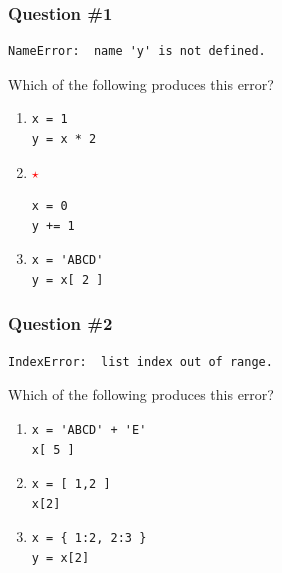 \documentclass[11pt]{beamer}
\newcommand{\correctstar}{\textcolor{red}{$\star$}}
\begin{document}
\begin{frame}[fragile]
  \frametitle{Question \#1}
  \Enlarge

  \begin{Verbatim}
NameError:  name 'y' is not defined.
  \end{Verbatim}

  Which of the following produces this error?

  \begin{enumerate}[label=\Alph*]
  \item
  \begin{Verbatim}
x = 1
y = x * 2
  \end{Verbatim}
  \item  \correctstar
  \begin{Verbatim}
x = 0
y += 1
  \end{Verbatim}
  \item
  \begin{Verbatim}
x = 'ABCD'
y = x[ 2 ]
  \end{Verbatim}
  \end{enumerate}
\end{frame}

\begin{frame}[fragile]
  \frametitle{Question \#2}
  \Enlarge

  \begin{Verbatim}
IndexError:  list index out of range.
  \end{Verbatim}

  Which of the following produces this error?

  \begin{enumerate}[label=\Alph*]
  \item
  \begin{Verbatim}
x = 'ABCD' + 'E'
x[ 5 ]
  \end{Verbatim}
  \item
  \begin{Verbatim}
x = [ 1,2 ]
x[2]
  \end{Verbatim}
  \item
  \begin{Verbatim}
x = { 1:2, 2:3 }
y = x[2]
  \end{Verbatim}
  \end{enumerate}
\end{frame}
\end{document}
